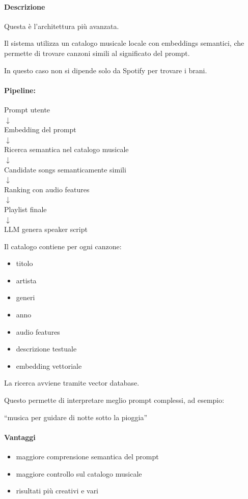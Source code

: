 \documentclass[11pt,a4paper]{article}
\begin{document}
\paragraph{Descrizione}
Questa è l'architettura più avanzata.

Il sistema utilizza un catalogo musicale locale con embeddings semantici, che permette di trovare canzoni simili al significato del prompt.

In questo caso non si dipende solo da Spotify per trovare i brani.

\paragraph{Pipeline:}
\begin{center}
Prompt utente \\
$\downarrow$ \\
Embedding del prompt \\
$\downarrow$ \\
Ricerca semantica nel catalogo musicale \\
$\downarrow$ \\
Candidate songs semanticamente simili \\
$\downarrow$ \\
Ranking con audio features \\
$\downarrow$ \\
Playlist finale \\
$\downarrow$ \\
LLM genera speaker script
\end{center}

Il catalogo contiene per ogni canzone:
\begin{itemize}
    \item titolo
    \item artista
    \item generi
    \item anno
    \item audio features
    \item descrizione testuale
    \item embedding vettoriale
\end{itemize}

La ricerca avviene tramite vector database.

Questo permette di interpretare meglio prompt complessi, ad esempio:

``musica per guidare di notte sotto la pioggia''

\paragraph{Vantaggi}
\begin{itemize}
    \item maggiore comprensione semantica del prompt
    \item maggiore controllo sul catalogo musicale
    \item risultati più creativi e vari
\end{itemize}
\end{document}
